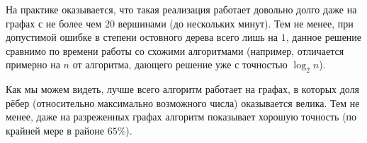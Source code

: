 \documentclass[a4paper,11pt]{article}
\theoremstyle{plain}
\theoremstyle{definition}
\theoremstyle{remark}
\begin{document}
На практике оказывается, что такая реализация работает довольно долго даже на графах с не более чем $20$ вершинами (до нескольких минут). Тем не менее, при допустимой ошибке в степени остовного дерева всего лишь на $1$, данное решение сравнимо по времени работы со схожими алгоритмами (например, отличается примерно на $n$ от алгоритма, дающего решение уже с точностью $\log_2n$).

Как мы можем видеть, лучше всего алгоритм работает на графах, в которых доля рёбер (относительно максимально возможного числа) оказывается велика. Тем не менее, даже на разреженных графах алгоритм показывает хорошую точность (по крайней мере в районе $65\%$).




\end{document}
